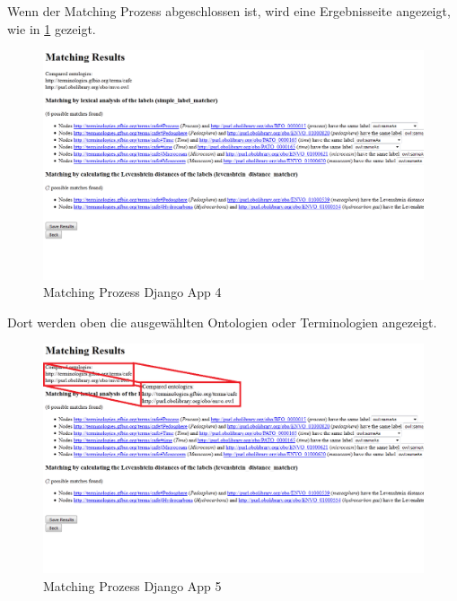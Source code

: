 		\pagebreak[4]
		Wenn der Matching Prozess abgeschlossen ist, wird eine Ergebnisseite
		angezeigt, wie in \ref{fig7} gezeigt.
		\begin{figure}[h!]
		\centering
		\includegraphics[width=1.0\textwidth]{pics/SimpleOntologyMatcher-Process3.png}
		\caption{Matching Prozess Django App 4}
		\label{fig7}
		\end{figure}
		
		\pagebreak[4]
		Dort werden oben die ausgewählten Ontologien oder Terminologien angezeigt.
		\begin{figure}[h!]
		\centering
		\includegraphics[width=1.0\textwidth]{pics/SimpleOntologyMatcher-Process4.png}
		\caption{Matching Prozess Django App 5}
		\label{fig8}
		\end{figure}
		
